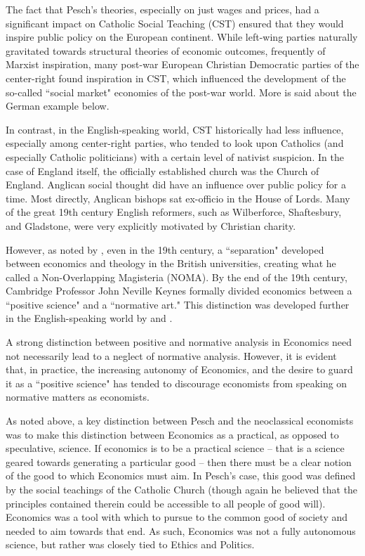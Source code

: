 \documentclass{article}
\begin{document}
The fact that Pesch’s theories, especially on just wages and prices, had a significant impact on Catholic Social Teaching (CST) ensured that they would inspire public policy on the European continent.  While left-wing parties naturally gravitated towards structural theories of economic outcomes, frequently of Marxist inspiration, many post-war European Christian Democratic parties of the center-right found inspiration in CST, which influenced the development of the so-called ``social market" economies of the post-war world.  More is said about the German example below.\medskip

In contrast, in the English-speaking world, CST historically had less influence, especially among center-right parties, who tended to look upon Catholics (and especially Catholic politicians) with a certain level of nativist suspicion.  In the case of England itself, the officially established church was the Church of England.  Anglican social thought did have an influence over public policy for a time.  Most directly, Anglican bishops sat ex-officio in the House of Lords.  Many of the great 19th century English reformers, such as Wilberforce, Shaftesbury, and Gladstone, were very explicitly motivated by Christian charity. \citep{hawtrey2014}\medskip

However, as noted by \citet{emmett2014}, even in the 19th century, a ``separation" developed between economics and theology in the British universities, creating what he called a Non-Overlapping Magisteria (NOMA).  By the end of the 19th century, Cambridge Professor John Neville Keynes formally divided economics between a ``positive science" and a ``normative art." \citep{keynes1904}  This distinction was developed further in the English-speaking world by \citet{robbins1932} and \citet{friedman1953}.\medskip

A strong distinction between positive and normative analysis in Economics need not necessarily lead to a neglect of normative analysis.  However, it is evident that, in practice, the increasing autonomy of Economics, and the desire to guard it as a ``positive science" has tended to discourage economists from speaking on normative matters as economists.\medskip

As noted above, a key distinction between Pesch and the neoclassical economists was to make this distinction between Economics as a practical, as opposed to speculative, science.  If economics is to be a practical science – that is a science geared towards generating a particular good – then there must be a clear notion of the good to which Economics must aim.  In Pesch’s case, this good was defined by the social teachings of the Catholic Church (though again he believed that the principles contained therein could be accessible to all people of good will).    Economics was a tool with which to pursue to the common good of society and needed to aim towards that end.  As such, Economics was not a fully autonomous science, but rather was closely tied to Ethics and Politics.\medskip
\end{document}
